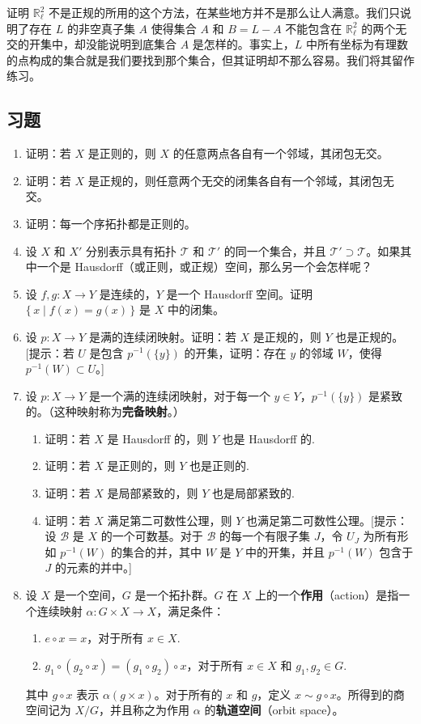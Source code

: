 \begin{example}
证明 $\mathbb{R}_{\ell}^{2}$ 不是正规的所用的这个方法，在某些地方并不是那么让人满意。我们只说明了存在 $L$ 的非空真子集 $A$ 使得集合 $A$ 和 $B=L-A$ 不能包含在 $\mathbb{R}_{\ell}^{2}$ 的两个无交的开集中，却没能说明到底集合 $A$ 是怎样的。事实上，$L$ 中所有坐标为有理数的点构成的集合就是我们要找到那个集合，但其证明却不那么容易。我们将其留作练习。
\end{example}

\subsection*{习题}

\begin{enumerate}
\item 证明：若 $X$ 是正则的，则 $X$ 的任意两点各自有一个邻域，其闭包无交。
\item 证明：若 $X$ 是正规的，则任意两个无交的闭集各自有一个邻域，其闭包无交。
\item 证明：每一个序拓扑都是正则的。
\item 设 $X$ 和 $X'$ 分别表示具有拓扑 $\mathcal{T}$ 和 $\mathcal{T}'$ 的同一个集合，并且 $\mathcal{T}'\supset\mathcal{T}$。如果其中一个是 Hausdorff（或正则，或正规）空间，那么另一个会怎样呢？
\item 设 $f,g\colon X\to Y$ 是连续的，$Y$ 是一个 Hausdorff 空间。证明 $\{\,x\mid f(x)=g(x)\,\}$ 是 $X$ 中的闭集。
\item 设 $p\colon X\to Y$ 是满的连续闭映射。证明：若 $X$ 是正规的，则 $Y$ 也是正规的。[提示：若 $U$ 是包含 $p^{-1}(\{y\})$ 的开集，证明：存在 $y$ 的邻域 $W$，使得 $p^{-1}(W)\subset U$。]
\item 设 $p\colon X\to Y$ 是一个满的连续闭映射，对于每一个 $y\in Y$，$p^{-1}(\{y\})$ 是紧致的。（这种映射称为\textbf{完备映射}。）
\begin{enumerate}
\item 证明：若 $X$ 是 Hausdorff 的，则 $Y$ 也是 Hausdorff 的.
\item 证明：若 $X$ 是正则的，则 $Y$ 也是正则的.
\item 证明：若 $X$ 是局部紧致的，则 $Y$ 也是局部紧致的.
\item 证明：若 $X$ 满足第二可数性公理，则 $Y$ 也满足第二可数性公理。[提示：设 $\mathcal{B}$ 是 $X$ 的一个可数基。对于 $\mathcal{B}$ 的每一个有限子集 $J$，令 $U_{J}$ 为所有形如 $p^{-1}(W)$ 的集合的并，其中 $W$ 是 $Y$ 中的开集，并且 $p^{-1}(W)$ 包含于 $J$ 的元素的并中。]
\end{enumerate}
\item 设 $X$ 是一个空间，$G$ 是一个拓扑群。$G$ 在 $X$ 上的一个\textbf{作用}（action）是指一个连续映射 $\alpha\colon G\times X\to X$，满足条件：
\begin{enumerate}
\item $e\circ x=x$，对于所有 $x\in X$.
\item $g_{1}\circ(g_{2}\circ x)=(g_{1}\circ g_{2})\circ x$，对于所有 $x\in X$ 和 $g_{1},g_{2}\in G$.
\end{enumerate}
其中 $g\circ x$ 表示 $\alpha(g\times x)$。对于所有的 $x$ 和 $g$，定义 $x\sim g\circ x$。所得到的商空间记为 $X/G$，并且称之为作用 $\alpha$ 的\textbf{轨道空间}（orbit space）。


\end{enumerate}
